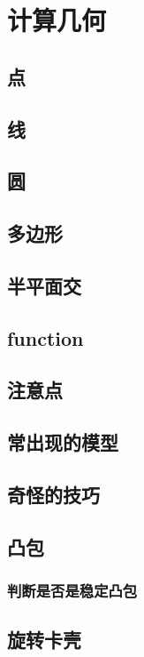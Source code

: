 \documentclass[10pt,a4paper]{article}
\begin{document}
\section{计算几何}
\subsection{点}

\subsection{线}

\subsection{圆}

\subsection{多边形}

\subsection{半平面交}

\subsection{function}

\subsection{注意点}

\subsection{常出现的模型}

\subsection{奇怪的技巧}

\subsection{凸包}
\subsubsection{判断是否是稳定凸包}

\subsection{旋转卡壳}
\end{document}
